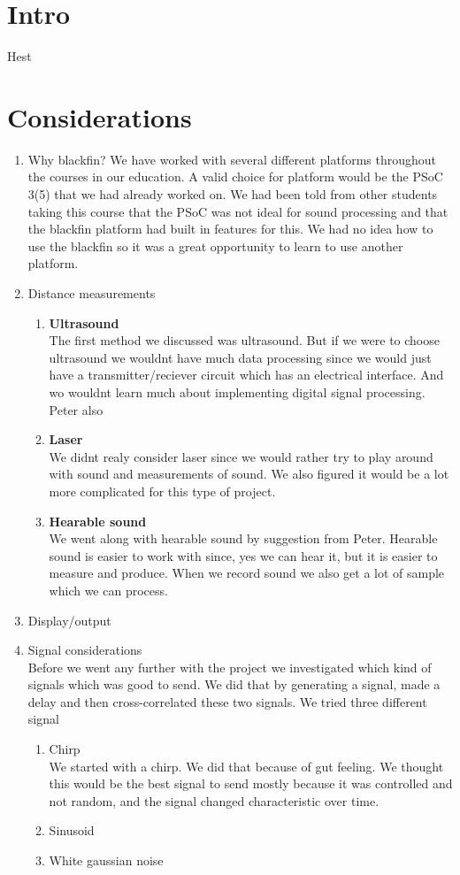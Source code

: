 \chapter{Intro}
Hest

\chapter{Considerations}
\begin{enumerate}
\item Why blackfin?
We have worked with several different platforms throughout the courses in our education. A valid choice for platform would be the PSoC 3(5) that we had already worked on. We had been told from other students taking this course that the PSoC was not ideal for sound processing and that the blackfin platform had built in features for this. We had no idea how to use the blackfin so it was a great opportunity to learn to use another platform. 
\item Distance measurements
\begin{enumerate}

\item \textbf{Ultrasound}\\
The first method we discussed was ultrasound. But if we were to choose ultrasound we wouldnt have much data processing since we would just have a transmitter/reciever circuit which has an electrical interface. And wo wouldnt learn much about implementing digital signal processing. Peter also 

\item \textbf{Laser}\\
We didnt realy consider laser since we would rather try to play around with sound and measurements of sound. We also figured it would be a lot more complicated for this type of project.

\item \textbf{Hearable sound}\\
We went along with hearable sound by suggestion from Peter. Hearable sound is easier to work with since, yes we can hear it, but it is easier to measure and produce. When we record sound we also get a lot of sample which we can process.

\end{enumerate}

\item Display/output
\item Signal considerations\\
Before we went any further with the project we investigated which kind of signals which was good to send. We did that by generating a signal, made a delay and then cross-correlated these two signals.
We tried three different signal
\begin{enumerate}
\item Chirp\\
We started with a chirp. We did that because of gut feeling. We thought this would be the best signal to send mostly because it was controlled and not random, and the signal changed characteristic over time.
\item Sinusoid
\item White gaussian noise




\end{enumerate}
\end{enumerate}

